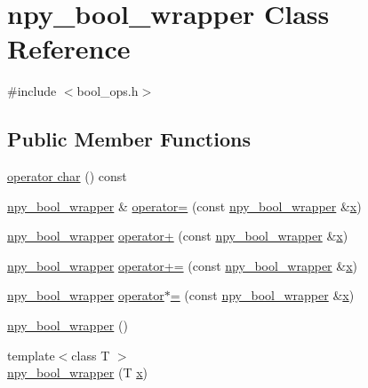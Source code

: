 \hypertarget{classnpy__bool__wrapper}{}\section{npy\+\_\+bool\+\_\+wrapper Class Reference}
\label{classnpy__bool__wrapper}


{\ttfamily \#include $<$bool\+\_\+ops.\+h$>$}

\subsection*{Public Member Functions}
\begin{DoxyCompactItemize}
\item 
\hyperlink{classnpy__bool__wrapper_a1916afb823587b4537294b2b7f8f7409}{operator char} () const 
\item 
\hyperlink{classnpy__bool__wrapper}{npy\+\_\+bool\+\_\+wrapper} \& \hyperlink{classnpy__bool__wrapper_a491a0a1b79e088697e10eed151813b65}{operator=} (const \hyperlink{classnpy__bool__wrapper}{npy\+\_\+bool\+\_\+wrapper} \&\hyperlink{vecnorm1_8cc_ac73eed9e41ec09d58f112f06c2d6cb63}{x})
\item 
\hyperlink{classnpy__bool__wrapper}{npy\+\_\+bool\+\_\+wrapper} \hyperlink{classnpy__bool__wrapper_a86eacd6e75021925454c4339ddba1945}{operator+} (const \hyperlink{classnpy__bool__wrapper}{npy\+\_\+bool\+\_\+wrapper} \&\hyperlink{vecnorm1_8cc_ac73eed9e41ec09d58f112f06c2d6cb63}{x})
\item 
\hyperlink{classnpy__bool__wrapper}{npy\+\_\+bool\+\_\+wrapper} \hyperlink{classnpy__bool__wrapper_ac0c1155f642c2f97643ff8fd07b20702}{operator+=} (const \hyperlink{classnpy__bool__wrapper}{npy\+\_\+bool\+\_\+wrapper} \&\hyperlink{vecnorm1_8cc_ac73eed9e41ec09d58f112f06c2d6cb63}{x})
\item 
\hyperlink{classnpy__bool__wrapper}{npy\+\_\+bool\+\_\+wrapper} \hyperlink{classnpy__bool__wrapper_ae6dedd5d32ef7c63a9f778d1c19ba7bc}{operator$\ast$=} (const \hyperlink{classnpy__bool__wrapper}{npy\+\_\+bool\+\_\+wrapper} \&\hyperlink{vecnorm1_8cc_ac73eed9e41ec09d58f112f06c2d6cb63}{x})
\item 
\hyperlink{classnpy__bool__wrapper_ab9b6504fe75dedd52a59e88d9d44ffa9}{npy\+\_\+bool\+\_\+wrapper} ()
\item 
{\footnotesize template$<$class T $>$ }\\\hyperlink{classnpy__bool__wrapper_ad2356263abed2cdd46521bc6fd5c874f}{npy\+\_\+bool\+\_\+wrapper} (T \hyperlink{vecnorm1_8cc_ac73eed9e41ec09d58f112f06c2d6cb63}{x})
\end{DoxyCompactItemize}

